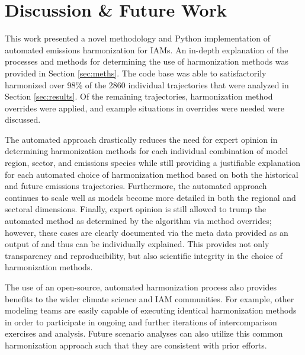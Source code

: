 \section{Discussion \& Future Work}\label{sec:future}

This work presented a novel methodology and Python implementation of automated
emissions harmonization for IAMs. An in-depth explanation of the processes and
methods for determining the use of harmonization methods was provided in Section
\ref{sec:meths}. The  code base was able to satisfactorily
harmonized over 98\% of the 2860 individual trajectories that were analyzed in
% 
% 
Section \ref{sec:results}. Of the remaining trajectories, harmonization method
overrides were applied, and example situations in overrides were needed
were discussed.

The automated approach drastically reduces the need for expert opinion in
determining harmonization methods for each individual combination of model
region, sector, and emissions species while still providing a justifiable
explanation for each automated choice of harmonization method based on both the
historical and future emissions trajectories. Furthermore, the automated
approach continues to scale well as models become more detailed in both the
regional and sectoral dimensions. Finally, expert opinion is still allowed to
trump the automated method as determined by the algorithm via method overrides;
however, these cases are clearly documented via the meta data provided as an
output of  and thus can be individually explained. This provides
not only transparency and reproducibility, but also scientific integrity in the
choice of harmonization methods.

The use of an open-source, automated harmonization process also provides
benefits to the wider climate science and IAM communities. For example, other
modeling teams are easily capable of executing identical harmonization methods
in order to participate in ongoing and further iterations of intercomparison
exercises and analysis. Future scenario analyses can also utilize this common
harmonization approach such that they are consistent with prior efforts.


